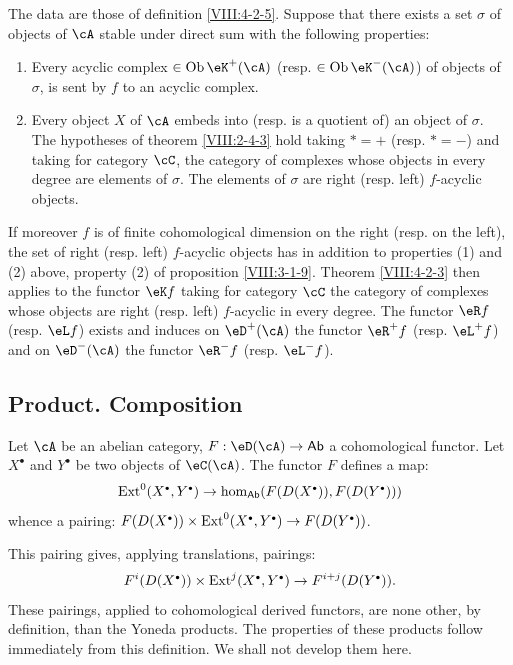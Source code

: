 \begin{corollary}\label{VIII:4-2-3-2} %
The data are those of definition \ref{VIII:4-2-5}. Suppose that there
exists a set $\sigma$ of objects of $\cA$ stable under direct sum
with the following properties:
\begin{enumerate}
  \item Every acyclic complex $\in \operatorname{Ob}{\eK^+(\cA)}$ (resp.
    $\in\operatorname{Ob}{\eK^-(\cA)}$) of objects of $\sigma$, is sent
    by $f$ to an acyclic complex.
  \item Every object $X$ of $\cA$ embeds into (resp. is a quotient of) an object
    of $\sigma$. The hypotheses of theorem \ref{VIII:2-4-3} hold
    taking $\ast=+$ (resp. $\ast=-$) and taking for
    category $\cC$, the category of complexes whose objects in every
    degree are elements of $\sigma$. The elements of $\sigma$
    are right (resp. left) $f$-acyclic objects.
\end{enumerate}

If moreover $f$ is of finite cohomological dimension on the right (resp. on the
left), the set of right (resp. left) $f$-acyclic objects
has in addition to properties (1) and (2) above, property
(2) of proposition \ref{VIII:3-1-9}. Theorem \ref{VIII:4-2-3}
then applies to the functor $\eK f$ taking for category $\cC$ the
category of complexes whose objects are right
(resp. left) $f$-acyclic in every degree. The functor $\eR f$ (resp. $\eL f$) exists
and induces on $\eD^+(\cA)$ the functor $\eR^+ f$ (resp. $\eL^+ f$) and on
$\eD^-(\cA)$ the functor $\eR^- f$ (resp. $\eL^- f$). 
\end{corollary}










\subsection{Product. Composition}\label{VIII:4-3}

Let $\cA$ be an abelian category, $F:\eD(\cA) \to \mathsf{Ab}$ a
cohomological functor. Let $X^\bullet$ and $Y^\bullet$ be two objects of
$\eC(\cA)$. The functor $F$ defines a map:
\[
  \ext^0(X^\bullet,Y^\bullet) \to \hom_{\mathsf{Ab}}(F(D(X^\bullet)),F(D(Y^\bullet)))
\]
whence a pairing:
$F(D(X^\bullet))\times \ext^0(X^\bullet,Y^\bullet) \to F(D(Y^\bullet))$.

This pairing gives, applying translations, pairings:
\[
  F^i(D(X^\bullet))\times \ext^j(X^\bullet,Y^\bullet) \to F^{i+j}(D(Y^\bullet)) \text{.}
\]
These pairings, applied to cohomological derived functors, are none
other, by definition, than the Yoneda products. The properties
of these products follow immediately from this definition. We shall not
develop them here.


